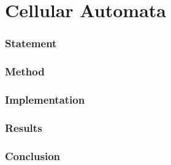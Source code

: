 \part{Cellular Automata}

\section{Statement}
\section{Method}
\section{Implementation}
\section{Results}
\section{Conclusion}
